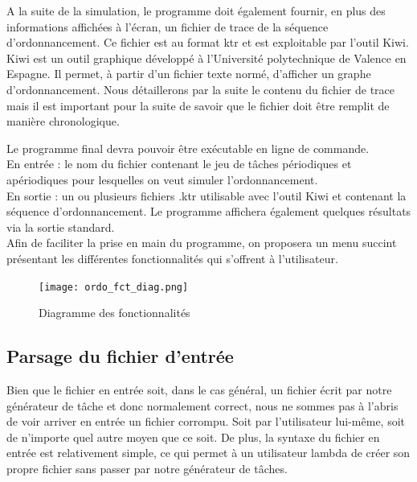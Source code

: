 		A la suite de la simulation, le programme doit également fournir, en plus des informations affichées à l'écran, un fichier de trace de la séquence d'ordonnancement. Ce fichier est au format \og ktr \fg et est exploitable par l'outil Kiwi. 
		Kiwi est un outil graphique développé à l'Université polytechnique de Valence en Espagne. Il permet, à partir d'un fichier texte normé, d'afficher un graphe d'ordonnancement. Nous détaillerons par la suite le contenu du fichier de trace mais il est important pour la suite de savoir que le fichier doit être remplit de manière chronologique.
		
		Le programme final devra pouvoir être exécutable en ligne de commande.\\
		
		En entrée : le nom du fichier contenant le jeu de tâches périodiques et apériodiques pour lesquelles on veut simuler l'ordonnancement.\\
		
		En sortie : un ou plusieurs fichiers .ktr utilisable avec l'outil Kiwi et contenant la séquence d'ordonnancement. Le programme affichera également quelques résultats via la sortie standard.\\
	
		Afin de faciliter la prise en main du programme, on proposera un menu succint présentant les différentes fonctionnalités qui s'offrent à l'utilisateur.
		
			\begin{figure}[!h]
				\centering
				\texttt{[image: ordo\_fct\_diag.png]}
				\caption{Diagramme des fonctionnalités}
			\end{figure}
			\FloatBarrier
			
			\subsection{Parsage du fichier d'entrée}
				Bien que le fichier en entrée soit, dans le cas général, un fichier écrit par notre générateur de tâche et donc normalement correct, nous ne sommes pas à l'abris de voir arriver en entrée un fichier corrompu. Soit par l'utilisateur lui-même, soit de n'importe quel autre moyen que ce soit. De plus, la syntaxe du fichier en entrée est relativement simple, ce qui permet à un utilisateur lambda de créer son propre fichier sans passer par notre générateur de tâches.
				
